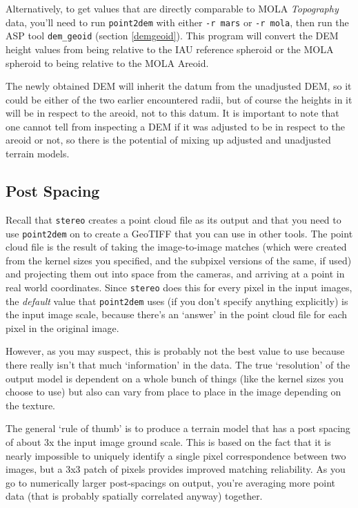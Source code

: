 Alternatively, to get values that are directly comparable to MOLA
\textit{Topography} data, you'll need to run \texttt{point2dem} with
either \texttt{-r mars} or \texttt{-r mola}, then run the ASP tool
\texttt{dem\_geoid} (section \ref{demgeoid}). This program will convert
the DEM height values from being relative to the IAU reference spheroid
or the MOLA spheroid to being relative to the MOLA Areoid.

The newly obtained DEM will inherit the datum from the unadjusted DEM,
so it could be either of the two earlier encountered radii, but of
course the heights in it will be in respect to the areoid, not to this
datum. It is important to note that one cannot tell from inspecting a
DEM if it was adjusted to be in respect to the areoid or not, so there is
the potential of mixing up adjusted and unadjusted terrain models.

\subsection{Post Spacing}
\label{post-spacing}

Recall that \texttt{stereo} creates a point cloud file as its output
and that you need to use \texttt{point2dem} on to create a GeoTIFF that
you can use in other tools.  The point cloud file is the result of
taking the image-to-image matches (which were created from the
kernel sizes you specified, and the subpixel versions of the same,
if used) and projecting them out into space from the cameras, and
arriving at a point in real world coordinates.  Since \texttt{stereo} does
this for every pixel in the input images, the \emph{default} value that
\texttt{point2dem} uses (if you don't specify anything explicitly) is the
input image scale, because there's an `answer' in the point cloud
file for each pixel in the original image.

However, as you may suspect, this is probably not the best value to
use because there really isn't that much `information' in the data.
The true `resolution' of the output model is dependent on a whole
bunch of things (like the kernel sizes you choose to use) but also can
vary from place to place in the image depending on the texture.

The general `rule of thumb' is to produce a terrain model that has a
post spacing of about 3x the input image ground scale.  This is based
on the fact that it is nearly impossible to uniquely identify a single
pixel correspondence between two images, but a 3x3 patch of pixels
provides improved matching reliability.  As you go to numerically
larger post-spacings on output, you're averaging more point data (that
is probably spatially correlated anyway) together.

